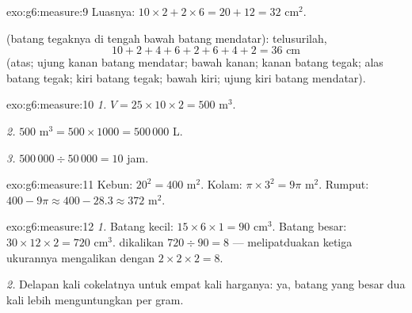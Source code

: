 \begin{solution}{exo:g6:measure:9}
Luasnya: $10 \times 2 + 2 \times 6 = 20 + 12 = 32$ cm$^2$.

 (batang tegaknya di tengah bawah batang mendatar): telusurilah,
\[
10 + 2 + 4 + 6 + 2 + 6 + 4 + 2 = 36 \text{ cm}
\]
(atas; ujung kanan batang mendatar; bawah kanan; kanan batang tegak;
alas batang tegak; kiri batang tegak; bawah kiri; ujung kiri batang mendatar).
\end{solution}

\begin{solution}{exo:g6:measure:10}
\emph{1.} $V = 25 \times 10 \times 2 = 500$ m$^3$.

\emph{2.} $500$ m$^3 = 500 \times 1000 = 500\,000$ L.

\emph{3.} $500\,000 \div 50\,000 = 10$ jam.
\end{solution}

\begin{solution}{exo:g6:measure:11}
Kebun: $20^2 = 400$ m$^2$. Kolam: $\pi \times 3^2 = 9\pi$ m$^2$.
Rumput: $400 - 9\pi \approx 400 - 28.3 \approx 372$ m$^2$.
\end{solution}

\begin{solution}{exo:g6:measure:12}
\emph{1.} Batang kecil: $15 \times 6 \times 1 = 90$ cm$^3$. Batang
besar: $30 \times 12 \times 2 = 720$ cm$^3$.  dikalikan
$720 \div 90 = 8$ --- melipatduakan ketiga ukurannya mengalikan
 dengan $2 \times 2 \times 2 = 8$.

\emph{2.} Delapan kali cokelatnya untuk empat kali harganya: ya,
batang yang besar dua kali lebih menguntungkan per gram.
\end{solution}

